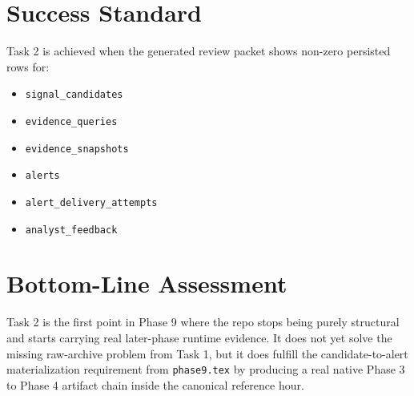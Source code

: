 \documentclass{article}
\begin{document}
\section*{Success Standard}
Task 2 is achieved when the generated review packet shows non-zero persisted rows for:
\begin{itemize}
\item \texttt{signal\_candidates}
\item \texttt{evidence\_queries}
\item \texttt{evidence\_snapshots}
\item \texttt{alerts}
\item \texttt{alert\_delivery\_attempts}
\item \texttt{analyst\_feedback}
\end{itemize}

\section*{Bottom-Line Assessment}
Task 2 is the first point in Phase 9 where the repo stops being purely structural and starts carrying real later-phase runtime evidence. It does not yet solve the missing raw-archive problem from Task 1, but it does fulfill the candidate-to-alert materialization requirement from \texttt{phase9.tex} by producing a real native Phase 3 to Phase 4 artifact chain inside the canonical reference hour.
\end{document}
